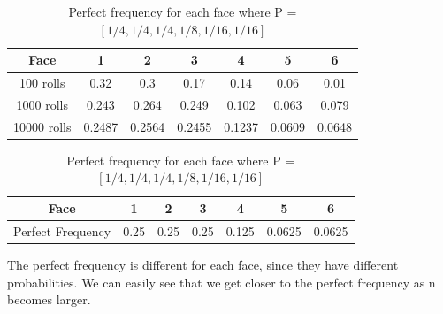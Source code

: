 \documentclass[a4paper]{article}
\begin{document}
\begin{table}[H]
\begin{center}
\begin{tabular}{|c|c|c|c|c|c|c|}
\hline
Face        & 1      & 2      & 3      & 4      & 5      & 6      \\ \hline
100 rolls   & 0.32   & 0.3   & 0.17    & 0.14   & 0.06   & 0.01   \\ \hline
1000 rolls  & 0.243  & 0.264  & 0.249  & 0.102  & 0.063  & 0.079  \\ \hline
10000 rolls & 0.2487 & 0.2564 & 0.2455 & 0.1237 & 0.0609 & 0.0648 \\ \hline
\end{tabular}
\caption*{\label{BD} Frequency of each face for different number of rolls}
\vspace{0.6cm}
\begin{tabular}{|c|c|c|c|c|c|c|}
\hline
Face              & 1    & 2    & 3    & 4     & 5      & 6      \\ \hline
Perfect Frequency & 0.25 & 0.25 & 0.25 & 0.125 & 0.0625 & 0.0625 \\ \hline
\end{tabular}
\caption*{\label{BD} Perfect frequency for each face where P = $[ 1/4, 1/4, 1/4, 1/8, 1/16, 1/16]$}
\end{center}
\end{table}
The perfect frequency is different for each face, since they have different probabilities. We can easily see that we get closer to the perfect frequency as n becomes larger.\\
\end{document}

